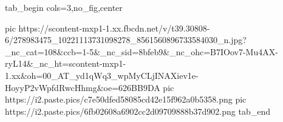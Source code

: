  
 
 
 
 


\ifcmt
  tab_begin cols=3,no_fig,center

     pic https://scontent-mxp1-1.xx.fbcdn.net/v/t39.30808-6/278983475_10221113731098278_8561560896733584030_n.jpg?_nc_cat=108&ccb=1-5&_nc_sid=8bfeb9&_nc_ohc=B7IOov7-Mu4AX-ryL14&_nc_ht=scontent-mxp1-1.xx&oh=00_AT_yd1qWq3_wpMyCLjINAXiev1e-HoyyP2vWpfdRwcHhmg&oe=626BB9DA
		 pic https://i2.paste.pics/c7e50dfed58085cd42e15f962a0b5358.png
		 pic https://i2.paste.pics/6fb02608a6902cc2d09709888b37d902.png
  tab_end
\fi
